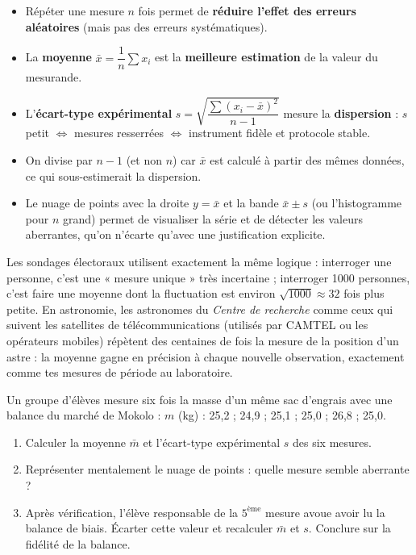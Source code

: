 \documentclass[11pt]{article}
\begin{document}
\begin{aretenir}
\begin{itemize}
\item Répéter une mesure $n$ fois permet de \textbf{réduire l'effet des erreurs aléatoires} (mais pas des erreurs systématiques).
\item La \textbf{moyenne} $\bar{x} = \dfrac{1}{n}\sum x_i$ est la \textbf{meilleure estimation} de la valeur du mesurande.
\item L'\textbf{écart-type expérimental} $s = \sqrt{\dfrac{\sum (x_i - \bar{x})^2}{n-1}}$ mesure la \textbf{dispersion} : $s$ petit $\Leftrightarrow$ mesures resserrées $\Leftrightarrow$ instrument fidèle et protocole stable.
\item On divise par $n-1$ (et non $n$) car $\bar{x}$ est calculé à partir des mêmes données, ce qui sous-estimerait la dispersion.
\item Le nuage de points avec la droite $y = \bar{x}$ et la bande $\bar{x} \pm s$ (ou l'histogramme pour $n$ grand) permet de visualiser la série et de détecter les valeurs aberrantes, qu'on n'écarte qu'avec une justification explicite.
\end{itemize}
\end{aretenir}

\begin{savaistu}
Les sondages électoraux utilisent exactement la même logique : interroger une personne, c'est une « mesure unique » très incertaine ; interroger 1000 personnes, c'est faire une moyenne dont la fluctuation est environ $\sqrt{1000} \approx 32$ fois plus petite. En astronomie, les astronomes du \emph{Centre de recherche} comme ceux qui suivent les satellites de télécommunications (utilisés par CAMTEL ou les opérateurs mobiles) répètent des centaines de fois la mesure de la position d'un astre : la moyenne gagne en précision à chaque nouvelle observation, exactement comme tes mesures de période au laboratoire.
\end{savaistu}

\begin{exercice}
Un groupe d'élèves mesure six fois la masse d'un même sac d'engrais avec une balance du marché de Mokolo : $m$ (kg) : 25,2 ; 24,9 ; 25,1 ; 25,0 ; 26,8 ; 25,0.
\begin{enumerate}
\item Calculer la moyenne $\bar{m}$ et l'écart-type expérimental $s$ des six mesures.
\item Représenter mentalement le nuage de points : quelle mesure semble aberrante ?
\item Après vérification, l'élève responsable de la $5^{\text{ème}}$ mesure avoue avoir lu la balance de biais. Écarter cette valeur et recalculer $\bar{m}$ et $s$. Conclure sur la fidélité de la balance.
\end{enumerate}
\end{exercice}
\end{document}
